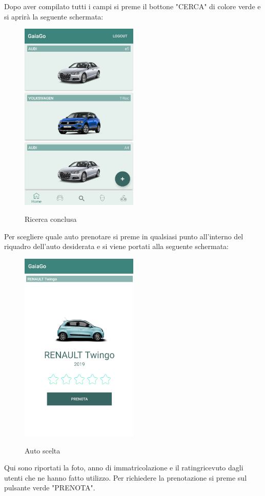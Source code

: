 Dopo aver compilato tutti i campi si preme il bottone "CERCA" di colore verde e si aprirà la seguente schermata:
  \begin{figure}[H] 
	\centering 
	\includegraphics[width=0.5\textwidth]{res/images/ricerca_conclusa.png}\\
	\caption{Ricerca conclusa}
	\label{conclusa}
\end{figure}
\pagebreak

Per scegliere quale auto prenotare si preme in qualsiasi punto all'interno del riquadro dell'auto desiderata e si viene portati alla seguente schermata:
  \begin{figure}[H] 
	\centering 
	\includegraphics[width=0.5\textwidth]{res/images/prenotazione1.png}\\
	\caption{Auto scelta}
	\label{scelta}
\end{figure}
Qui sono riportati la foto, anno di immatricolazione e il rating\glosp ricevuto dagli utenti che ne hanno fatto utilizzo. Per richiedere la prenotazione si preme sul pulsante verde "PRENOTA".
\pagebreak

